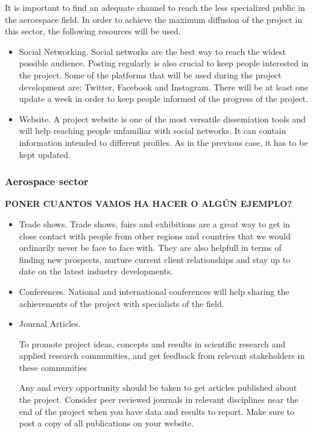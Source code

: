 It is important to find an adequate channel to reach the less specialized public in the aeroespace field. In order to achieve the maximum diffusion of the project in this sector,  the following resources will be used.

\begin{itemize}
\item{ 
	Social Networking. Social networks are the best way to reach the widest possible audience. Posting regularly is also crucial to keep people interested in the project. Some of the platforms that will be used during the project development are: Twitter, Facebook and Instagram. There will be at least one update a week in order to keep people informed of the progress of the project.
}
\item {
	Website. A project website is one of the most versatile dissemiation tools and will help reaching people unfamiliar with social networks. It can contain information intended to different profiles. As in the previous case, it has to be kept updated.
}
\end{itemize}

\subsubsection{Aerospace sector}

\textbf{PONER CUANTOS VAMOS HA HACER O ALGÚN EJEMPLO?}
\begin{itemize}

\item{
	Trade shows. Trade shows, fairs and exhibitions are a great way to get in close contact with people from other regions and countries that we would ordinarily never be face to face with. They are also helpfull in terms of finding new prospects, nurture current client relationships and stay up to date on the latest industry developments. 
}
\item {
	Conferences. National and international conferences will help sharing the achievements of the project with specialists of the field.
}
\item {
	Journal Articles. 
	
	
	To promote project ideas, concepts and results in scientific research and applied research communities, and get feedback from relevant stakeholders in these communities
	
	Any and every opportunity should be taken to get articles published about the project. Consider peer reviewed journals in relevant disciplines near the end of the project when you have data and results to report. Make sure to post a copy of all publications on your website. 
}
\end{itemize}